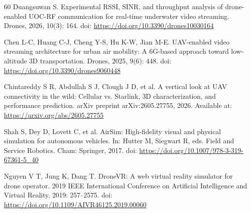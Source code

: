 \documentclass[fleqn]{VRIH2025}
\begin{document}
\begin{thebibliography}{60}
Duangsuwan S. Experimental RSSI, SINR, and throughput analysis of drone-enabled UOC-RF communication for real-time underwater video streaming. Drones, 2026, 10(3): 164. doi: \url{https://doi.org/10.3390/drones10030164}

Chen L-C, Huang C-J, Cheng Y-S, Hu K-W, Jian M-E. UAV-enabled video streaming architecture for urban air mobility: A 6G-based approach toward low-altitude 3D transportation. Drones, 2025, 9(6): 448. doi: \url{https://doi.org/10.3390/drones9060448}

Chintareddy S R, Abdullah S J, Clough J D, et al. A vertical look at UAV connectivity in the wild: Cellular vs. Starlink, 3D characterization, and performance prediction. arXiv preprint arXiv:2605.27755, 2026. Available at: \url{https://arxiv.org/abs/2605.27755}

Shah S, Dey D, Lovett C, et al. AirSim: High-fidelity visual and physical simulation for autonomous vehicles. In: Hutter M, Siegwart R, eds. Field and Service Robotics. Cham: Springer, 2017. doi: \url{https://doi.org/10.1007/978-3-319-67361-5_40}

Nguyen V T, Jung K, Dang T. DroneVR: A web virtual reality simulator for drone operator. 2019 IEEE International Conference on Artificial Intelligence and Virtual Reality, 2019: 257--2575. doi: \url{https://doi.org/10.1109/AIVR46125.2019.00060}

\end{thebibliography}
\end{document}
